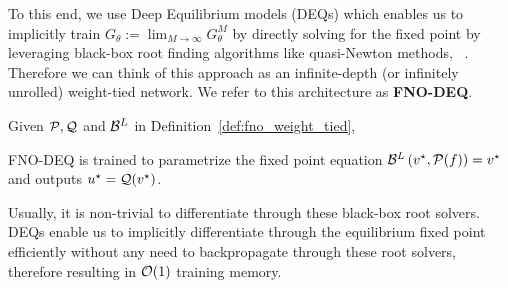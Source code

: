 To this end, we use Deep Equilibrium models (DEQs) which enables 
us to implicitly train $G_\theta := \lim_{M\to\infty} G_\theta^{M}$ by directly 
solving for the fixed point by leveraging black-box root finding algorithms
like quasi-Newton methods,
~\citep{broyden1965class,anderson1965iterative}. Therefore
we can think of this approach as an infinite-depth (or infinitely unrolled) weight-tied network. 
We refer to this architecture as \textbf{FNO-DEQ}. 
\begin{definition}
    \label{def:fno_deq}
    Given ${\mathcal{P}}, {\mathcal{Q}}$ and ${\mathcal{B}}^{L}$ in 
    Definition~\ref{def:fno_weight_tied}, 
    
    FNO-DEQ is trained to parametrize the fixed point equation 
    ${\mathcal{B}}^{L}\left(v^\star, {\mathcal{P}}(f)\right) = v^\star$ and outputs $u^\star = {\mathcal{Q}}(v^\star)$.
\end{definition}


Usually, it is non-trivial to differentiate through these black-box root solvers. DEQs enable us to implicitly differentiate through the equilibrium 
fixed point efficiently without any need to backpropagate through these root solvers, therefore resulting in ${\mathcal{O}}(1)$ training memory. 

